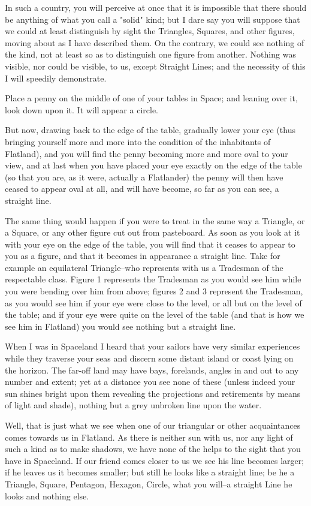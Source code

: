 \documentclass[edeposit,fullpage]{uiucthesis2014}
\begin{document}
In such a country, you will perceive at once that it is impossible that
there should be anything of what you call a "solid" kind; but I dare
say you will suppose that we could at least distinguish by sight the
Triangles, Squares, and other figures, moving about as I have described
them.  On the contrary, we could see nothing of the kind, not at least
so as to distinguish one figure from another.  Nothing was visible, nor
could be visible, to us, except Straight Lines; and the necessity of
this I will speedily demonstrate.

Place a penny on the middle of one of your tables in Space; and leaning
over it, look down upon it.  It will appear a circle.

But now, drawing back to the edge of the table, gradually lower your
eye (thus bringing yourself more and more into the condition of the
inhabitants of Flatland), and you will find the penny becoming more and
more oval to your view, and at last when you have placed your eye
exactly on the edge of the table (so that you are, as it were, actually
a Flatlander) the penny will then have ceased to appear oval at all,
and will have become, so far as you can see, a straight line.

The same thing would happen if you were to treat in the same way a
Triangle, or a Square, or any other figure cut out from pasteboard.  As
soon as you look at it with your eye on the edge of the table, you will
find that it ceases to appear to you as a figure, and that it becomes
in appearance a straight line.  Take for example an equilateral
Triangle--who represents with us a Tradesman of the respectable class.
Figure 1 represents the Tradesman as you would see him while you were
bending over him from above; figures 2 and 3 represent the Tradesman,
as you would see him if your eye were close to the level, or all but on
the level of the table; and if your eye were quite on the level of the
table (and that is how we see him in Flatland) you would see nothing
but a straight line.

When I was in Spaceland I heard that your sailors have very similar
experiences while they traverse your seas and discern some distant
island or coast lying on the horizon.  The far-off land may have bays,
forelands, angles in and out to any number and extent; yet at a
distance you see none of these (unless indeed your sun shines bright
upon them revealing the projections and retirements by means of light
and shade), nothing but a grey unbroken line upon the water.

Well, that is just what we see when one of our triangular or other
acquaintances comes towards us in Flatland.  As there is neither sun
with us, nor any light of such a kind as to make shadows, we have none
of the helps to the sight that you have in Spaceland.  If our friend
comes closer to us we see his line becomes larger; if he leaves us it
becomes smaller; but still he looks like a straight line; be he a
Triangle, Square, Pentagon, Hexagon, Circle, what you will--a straight
Line he looks and nothing else.
\end{document}
